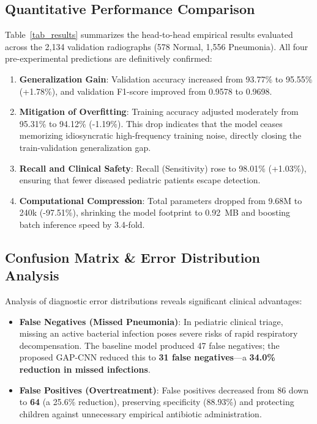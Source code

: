 \documentclass[conference]{IEEEtran}
\begin{document}
\subsection{Quantitative Performance Comparison}
Table~\ref{tab_results} summarizes the head-to-head empirical results evaluated across the 2,134 validation radiographs (578 Normal, 1,556 Pneumonia).
All four pre-experimental predictions are definitively confirmed:
\begin{enumerate}
    \item \textbf{Generalization Gain}: Validation accuracy increased from 93.77\% to 95.55\% (+1.78\%), and validation F1-score improved from 0.9578 to 0.9698.
    \item \textbf{Mitigation of Overfitting}: Training accuracy adjusted moderately from 95.31\% to 94.12\% (-1.19\%). This drop indicates that the model ceases memorizing idiosyncratic high-frequency training noise, directly closing the train-validation generalization gap.
    \item \textbf{Recall and Clinical Safety}: Recall (Sensitivity) rose to 98.01\% (+1.03\%), ensuring that fewer diseased pediatric patients escape detection.
    \item \textbf{Computational Compression}: Total parameters dropped from 9.68M to 240k (-97.51\%), shrinking the model footprint to 0.92~MB and boosting batch inference speed by 3.4-fold.
\end{enumerate}

\subsection{Confusion Matrix \& Error Distribution Analysis}
Analysis of diagnostic error distributions reveals significant clinical advantages:
\begin{itemize}
    \item \textbf{False Negatives (Missed Pneumonia)}: In pediatric clinical triage, missing an active bacterial infection poses severe risks of rapid respiratory decompensation. The baseline model produced 47 false negatives; the proposed GAP-CNN reduced this to \textbf{31 false negatives}—a \textbf{34.0\% reduction in missed infections}.
    \item \textbf{False Positives (Overtreatment)}: False positives decreased from 86 down to \textbf{64} (a 25.6\% reduction), preserving specificity (88.93\%) and protecting children against unnecessary empirical antibiotic administration.
\end{itemize}
\end{document}
